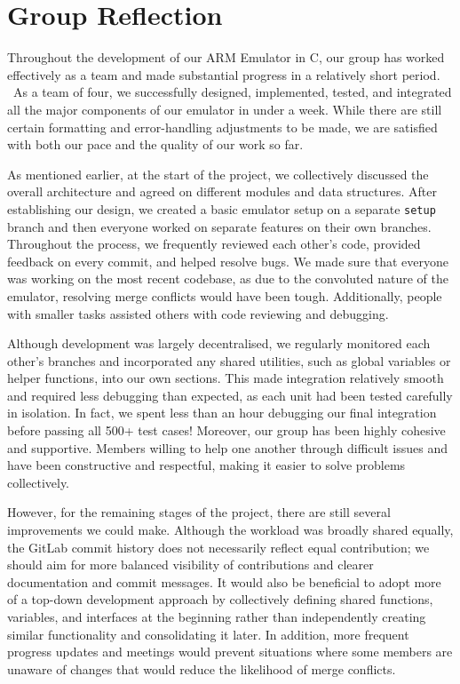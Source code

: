 \documentclass{article}
\begin{document}
\section{Group Reflection}

Throughout the development of our ARM Emulator in C, our group has worked effectively as a team and made substantial progress in a relatively short period.  As a team of four, we successfully designed, implemented, tested, and integrated all the major components of our emulator in under a week. While there are still certain formatting and error-handling adjustments to be made, we are satisfied with both our pace and the quality of our work so far.

As mentioned earlier,  at the start of the project, we collectively discussed the overall architecture and agreed on different modules and data structures. After establishing our design, we created a basic emulator setup on a separate \verb|setup| branch and then everyone worked on separate features on their own branches. Throughout the process, we frequently reviewed each other's code, provided feedback on every commit, and helped resolve bugs. We made sure that everyone was working on the most recent codebase, as due to the convoluted nature of the emulator, resolving merge conflicts would have been tough. Additionally, people with smaller tasks assisted others with code reviewing and debugging.

Although development was largely decentralised, we regularly monitored each other's branches and incorporated any shared utilities, such as global variables or helper functions, into our own sections. This made integration relatively smooth and required less debugging than expected, as each unit had been tested carefully in isolation. In fact, we spent less than an hour debugging our final integration before passing all 500+ test cases! Moreover, our group has been highly cohesive and supportive. Members willing to help one another through difficult issues and have been constructive and respectful, making it easier to solve problems collectively.

However, for the remaining stages of the project, there are still several improvements we could make. Although the workload was broadly shared equally, the GitLab commit history does not necessarily reflect equal contribution; we should aim for more balanced visibility of contributions and clearer documentation and commit messages. It would also be beneficial to adopt more of a top-down development approach by collectively defining shared functions, variables, and interfaces at the beginning rather than independently creating similar functionality and consolidating it later. In addition, more frequent progress updates and meetings would prevent situations where some members are unaware of changes that would reduce the likelihood of merge conflicts. 
\end{document}
